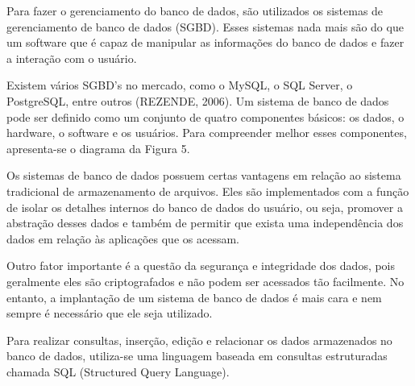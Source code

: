 Para fazer o gerenciamento do banco de dados, são utilizados os sistemas de gerenciamento de banco de dados (SGBD). Esses sistemas nada mais são do que um software que é capaz de manipular as informações do banco de dados e fazer a interação com o usuário.

Existem vários SGBD’s no mercado, como o MySQL, o SQL Server, o PostgreSQL, entre outros (REZENDE, 2006).
Um sistema de banco de dados pode ser definido como um conjunto de quatro componentes básicos: os dados, o hardware, o software e os usuários. Para compreender melhor esses componentes, apresenta-se o diagrama da Figura 5.

Os sistemas de banco de dados possuem certas vantagens em relação ao sistema tradicional de armazenamento de arquivos. Eles são implementados com a função de isolar os detalhes internos do banco de dados do usuário, ou seja, promover a abstração desses dados e também de permitir que exista uma independência dos dados em relação às aplicações que os
acessam. 

Outro fator importante é a questão da segurança e integridade dos dados, pois geralmente eles são criptografados e não podem ser acessados tão facilmente. No entanto, a implantação de um sistema de banco de dados é mais cara e nem sempre é necessário que ele seja utilizado.

Para realizar consultas, inserção, edição e relacionar os dados armazenados no banco de dados, utiliza-se uma linguagem baseada em consultas estruturadas chamada SQL (Structured Query Language).